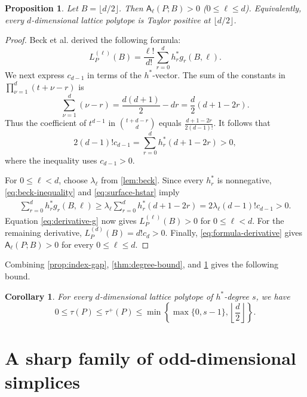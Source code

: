 \documentclass[reqno, 12pt]{article}
\numberwithin{equation}{section}
\newtheorem{proposition}[theorem]{Proposition}
\newtheorem{corollary}[theorem]{Corollary}
\theoremstyle{definition}
\newcommand{\A}{\mathsf{A}}
\begin{document}
\begin{proposition}\label{prop:dimension-bound}
Let $B=\lfloor d/2\rfloor$.  Then $\A_\ell(P;B)>0$ ($0\leq\ell\leq d$).
Equivalently, every $d$-dimensional lattice polytope is Taylor positive at $\lfloor d/2\rfloor$.
\end{proposition}
\begin{proof}
Beck et al. \cite[Page 15]{BeckEtAl2005} derived the following formula:
\begin{equation}\label{eq:derivative-g}
 L_P^{(\ell)}(B)=\frac{\ell!}{d!}\sum_{r=0}^{d}h_r^*g_r(B,\ell).
\end{equation}
We next express $c_{d-1}$ in terms of the $h^*$-vector.  The sum of the
constants in $\prod_{\nu=1}^{d}(t+\nu-r)$ is
\[\sum_{\nu=1}^{d}(\nu-r)=\frac{d(d+1)}2-dr=\frac d2(d+1-2r).
\]
Thus the coefficient of $t^{d-1}$ in $\binom{t+d-r}{d}$ equals $\frac{d+1-2r}{2(d-1)!}$.
It follows that
\begin{equation}\label{eq:surface-hstar}
 2(d-1)!c_{d-1}=\sum_{r=0}^{d}h_r^*(d+1-2r)>0,
\end{equation}
where the inequality uses $c_{d-1}>0$.

For $0\leq\ell<d$, choose $\lambda_\ell$ from \cref{lem:beck}.  Since
every $h_r^*$ is nonnegative, \eqref{eq:beck-inequality} and
\eqref{eq:surface-hstar} imply
\begin{align*}
\sum_{r=0}^{d}h_r^*g_r(B,\ell)\geq\lambda_\ell\sum_{r=0}^{d}h_r^*(d+1-2r)=2\lambda_\ell(d-1)!c_{d-1}>0.
\end{align*}
Equation \eqref{eq:derivative-g} now gives $L_P^{(\ell)}(B)>0$ for $0\leq\ell<d$.  For the remaining derivative,
$L_P^{(d)}(B)=d!c_d>0$.  Finally, \eqref{eq:formula-derivative} gives $\A_\ell(P;B)>0$ for every
$0\leq\ell\leq d$.
\end{proof}

Combining \cref{prop:index-gap}, \cref{thm:degree-bound}, and \cref{prop:dimension-bound} gives the following bound.

\begin{corollary}\label{cor:combined-bound}
For every $d$-dimensional lattice polytope of $h^*$-degree $s$, we have 
\[0\leq\tau(P)\leq\tau^+(P)\leq\min\!\left\{\max\{0,s-1\},\left\lfloor\frac d2\right\rfloor\right\}.
\]
\end{corollary}

\section{A sharp family of odd-dimensional simplices}
\label{sec:unit-center}
\end{document}
